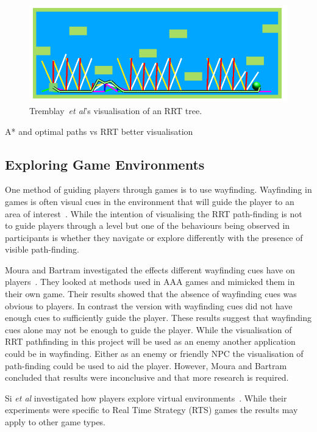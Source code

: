 \documentclass[journal]{IEEEtran}
\begin{document}
\begin{figure}[h]
	\includegraphics[width=1.0\linewidth]{Tremblay2014.png}
	\caption{ Tremblay~\textit{et al}'s visualisation of an RRT tree\cite{Tremblay2014}.}
	\label{Tremblay2014}
\end{figure} 

A* and optimal paths vs RRT better visualisation 


\subsection{Exploring Game Environments}
One method of guiding players through games is to use wayfinding. Wayfinding in games is often visual cues in the environment that will guide the player to an area of interest~\cite{si2017, Bacim2008}. While the intention of visualising the RRT path-finding is not to guide players through a level but one of the behaviours being observed in participants is whether they  navigate or explore differently with the presence of visible path-finding. 

Moura and Bartram investigated the effects different wayfinding cues have on players~\cite{moura2014}.  They looked at methods used in AAA games and mimicked them in their own game. Their results showed that the absence of wayfinding cues was obvious to players. In contrast the version with wayfinding cues did not have enough cues to sufficiently guide the player. These results suggest that wayfinding cues alone may not be enough to guide the player. While the visualisation of RRT pathfinding in this project will be used as an enemy another application could be in wayfinding. Either as an enemy or friendly NPC the visualisation of path-finding could be used to aid the player. However, Moura and Bartram concluded that results were inconclusive and that more research is required. 
 
Si \textit{et al} investigated how players explore virtual environments~\cite{si2017}. While their experiments were specific to Real Time Strategy (RTS) games the results may apply to other game types.
\end{document}
